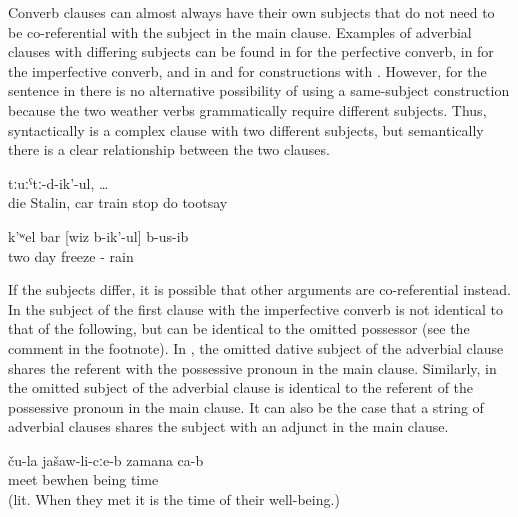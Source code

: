 Converb clauses can almost always have their own subjects that do not need to be co-referential with the subject in the main clause. Examples of adverbial clauses with differing subjects can be found in  for the perfective converb, in  for the imperfective converb, and in  and  for constructions with . However, for the sentence in  there is no alternative possibility of using a same-subject construction because the two weather verbs grammatically require different subjects. Thus, syntactically  is a complex clause with two different subjects, but semantically there is a clear relationship between the two clauses.
%
\begin{exe}
	\ex	\label{ex:Stalin died, and the cars, the trains were stopped making tooot}
	 	tːuːˁtː-d-ik'-ul, \ldots\\
		die	Stalin,	car	train	stop do 	tootsay\\
	\glt	{}

	\ex	\label{ex:‎Two days it was freezing and raining}
	\gll	k'ʷel	bar	[wiz	b-ik'-ul]	b-us-ib\\
		two	day	freeze	-	rain\\
	\glt	{}
\end{exe}

If the subjects differ, it is possible that other arguments are co-referential instead. In  the subject of the first clause with the imperfective converb is not identical to that of the following, but can be identical to the omitted possessor (see the comment in the footnote). In , the omitted dative subject of the adverbial clause shares the referent with the possessive pronoun in the main clause. Similarly, in  the omitted subject of the adverbial clause is identical to the referent of the possessive pronoun in the main clause. It can also be the case that a string of adverbial clauses shares the subject with an adjunct in the main clause.
%
\begin{exe}
	\ex	\label{ex:When they got married, they had a good life}
	\gll	[can	ka-b-iž-ib=qːel]	ču-la	jašaw-li-cːe-b	zamana	ca-b\\
		meet	bewhen		being	time	\\
	\glt	{} (lit. When they met it is the time of their well-being.)
\end{exe}

